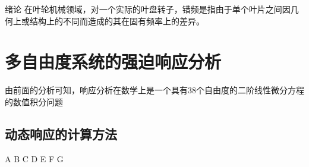
\begin{mchapter}{绪论}
    在叶轮机械领域，对一个实际的叶盘转子，错频是指由于单个叶片之间因几何上或结构上的不同而造成的其在固有频率上的差异。
    \section{多自由度系统的强迫响应分析}
    由前面的分析可知，响应分析在数学上是一个具有38个自由度的二阶线性微分方程的数值积分问题
    \subsection{动态响应的计算方法}
    A B C D E F G
\end{mchapter}